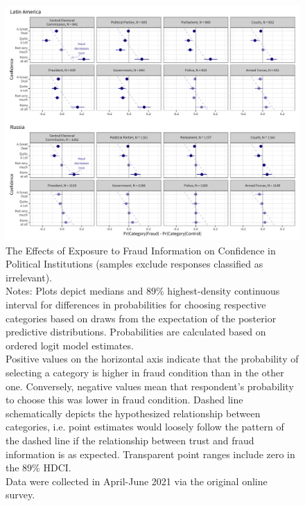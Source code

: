 \documentclass[11pt, ngerman,english,a4]{article}
\begin{document}
\begin{figure}[H]
    \centering
    \includegraphics[width=\linewidth,trim=4 4 4 4,clip]{figs/main_hdi89_2.png}
    \caption{The Effects of Exposure to Fraud Information on Confidence in Political Institutions (samples exclude responses classified as irrelevant).  \\
     \footnotesize{Notes: Plots depict medians and 89\% highest-density continuous interval for differences in probabilities for choosing respective categories based on draws from the expectation of the posterior predictive distributions. Probabilities are calculated based on ordered logit model estimates.\\
     Positive values on the horizontal axis indicate that the probability of selecting a category is higher in fraud condition than in the other one. Conversely, negative values mean that respondent's probability to choose this was lower in fraud condition. Dashed line schematically depicts the hypothesized relationship between categories, i.e. point estimates would loosely follow the pattern of the dashed line if the relationship between trust and fraud information is as expected. Transparent point ranges include zero in the 89\% HDCI.\\
     Data were collected in April-June 2021 via the original online survey. } }
    \singlespacing
    \raggedright
    
    \label{fig:main-2}
    \end{figure}
    
\end{document}
